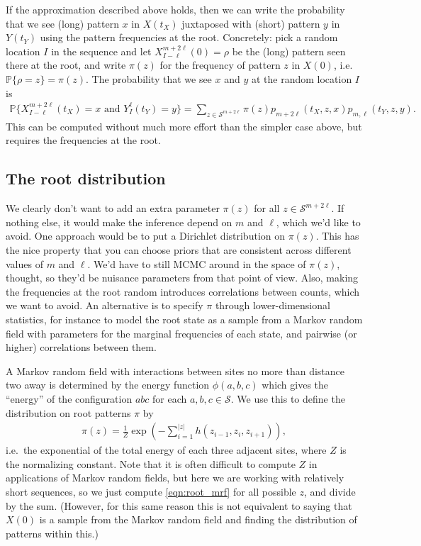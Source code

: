\documentclass{article}
\renewcommand{\P}{\mathbb{P}}
\newcommand{\calS}{\mathcal{S}}  %
\theoremstyle{plain}
\theoremstyle{definition}
\begin{document}
If the approximation described above holds,
then we can write the probability that we see (long) pattern $x$ in $X(t_X)$ juxtaposed with (short) pattern $y$ in $Y(t_Y)$
using the pattern frequencies at the root.
Concretely: pick a random location $I$ in the sequence and let $X_{I-\ell}^{m+2\ell}(0) = \rho$ be the (long) pattern seen there at the root,
and write $\pi(z)$ for the frequency of pattern $z$ in $X(0)$, i.e.\ $\P\{\rho=z\}=\pi(z)$.
The probability that we see $x$ and $y$ at the random location $I$ is
\begin{align} \label{eqn:phylo_likelihood}
    \P\{X_{I-\ell}^{m+2\ell}(t_X)=x \text{ and } Y_I^\ell(t_Y)=y \} = \sum_{z \in \calS^{m+2\ell}} \pi(z) p_{m+2\ell}(t_X,z,x) p_{m,\ell}(t_Y,z,y) .
\end{align}
This can be computed without much more effort than the simpler case above,
but requires the frequencies at the root.

\subsection{The root distribution}

We clearly don't want to add an extra parameter $\pi(z)$ for all $z \in \calS^{m+2\ell}$. 
If nothing else, it would make the inference depend on $m$ and $\ell$, which we'd like to avoid.
One approach would be to put a Dirichlet distribution on $\pi(z)$.
This has the nice property that you can choose priors that are consistent across different values of $m$ and $\ell$.
We'd have to still MCMC around in the space of $\pi(z)$, thought, so they'd be nuisance parameters from that point of view.
Also, making the frequencies at the root random introduces correlations between counts, which we want to avoid.
An alternative is to specify $\pi$ through lower-dimensional statistics,
for instance to model the root state as a sample from a Markov random field
with parameters for the marginal frequencies of each state, and pairwise (or higher) correlations between them.

A Markov random field with interactions between sites no more than distance two away 
is determined by the energy function $\phi(a,b,c)$ which gives the ``energy'' of the configuration $abc$ for each $a,b,c \in \calS$.
We use this to define the distribution on root patterns $\pi$ by
\begin{align}  \label{eqn:root_mrf}
    \pi(z) = \frac{1}{Z} \exp\left( - \sum_{i=1}^{|z|} h(z_{i-1},z_i,z_{i+1}) \right),
\end{align}
i.e.\ the exponential of the total energy of each three adjacent sites,
where $Z$ is the normalizing constant.
Note that it is often difficult to compute $Z$ in applications of Markov random fields,
but here we are working with relatively short sequences, 
so we just compute \eqref{eqn:root_mrf} for all possible $z$, and divide by the sum.
(However, for this same reason this is not equivalent to saying that $X(0)$ is a sample from the Markov random field
and finding the distribution of patterns within this.)
\end{document}
